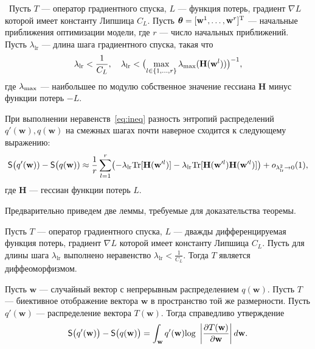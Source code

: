 \begin{theorem}~Пусть $T$ --- оператор градиентного спуска,
 $L$ --- функция потерь, градиент $\nabla L$ которой имеет константу Липшица $C_L$.  Пусть $\boldsymbol{\theta} = [\mathbf{w}^1,\dots,\mathbf{w}^r]^\text{T}$ ---  начальные приближения оптимизации модели, где $r$ --- число начальных приближений. Пусть $\lambda_{\text{lr}}$ --- длина шага градиентного спуска, такая что
\begin{equation}
\label{eq:ineq}
\lambda_{\text{lr}}<\frac{1}{C_L}, \quad \lambda_{\text{lr}} < \bigl(\max_{l \in \{1,\dots,r\}}\lambda_\textnormal{max} (\mathbf{H}(\mathbf{w}^l))\bigr)^{-1}, 
\end{equation}
где $\lambda_\textnormal{max}$ --- наибольшее по модулю собственное значение гессиана  $\mathbf{H}$ минус функции потерь $-L$.

При выполнении неравенств~\eqref{eq:ineq} разность энтропий распределений $q'(\mathbf{w}), q(\mathbf{w})$ на смежных шагах почти наверное сходится к следующему выражению: 
\begin{equation}
\label{eq:entropy}
	\mathsf{S}\bigl(q'(\mathbf{w})) -  \mathsf{S}\bigl(q(\mathbf{w}))  \approx  \frac{1}{r}\sum_{l=1}^r \bigl(-\lambda_{\text{lr}} \textnormal{Tr}[\mathbf{H}(\mathbf{w}'^l)] - \lambda_{\text{lr}} \textnormal{Tr}[\mathbf{H}(\mathbf{w}'^l)\mathbf{H}(\mathbf{w}'^l)]  \bigr) + o_{\lambda_{\text{lr}}^2 \to 0}(1),
\end{equation}
где $\mathbf{H}$ --- гессиан функции потерь $L$.
\end{theorem}

Предварительно приведем две леммы, требуемые для доказательства теоремы.
\begin{lemma} Пусть $T$ --- оператор градиентного спуска, $L$ --- дважды дифференцируемая функция потерь, градиент $\nabla L$ которой имеет константу Липшица $C_L$.  Пусть для длины шага $\lambda_{\text{lr}}$ выполнено неравенство 
$
	\lambda_{\text{lr}}<\frac{1}{C_L}.
$
Тогда $T$ является диффеоморфизмом.
\end{lemma}

\begin{lemma} Пусть $\mathbf{w}$ --- случайный вектор с непрерывным распределением $q(\mathbf{w})$. Пусть $T$ --- биективное отображение вектора $\mathbf{w}$ в пространство той же размерности. Пусть $q'(\mathbf{w})$ --- распределение вектора $T(\mathbf{w})$. Тогда справедливо утверждение
\begin{equation}
\label{eq:entropy_biject}
	\mathsf{S}\bigl(q'(\mathbf{w})\bigr) -  \mathsf{S}\bigl(q(\mathbf{w})\bigr)  = \int_\mathbf{w}  q'(\mathbf{w}) \textnormal{log}~\left|\frac{\partial{T(\mathbf{w})}}{\partial{\mathbf{w}}}\right| d\mathbf{w}.
\end{equation}
\end{lemma}


